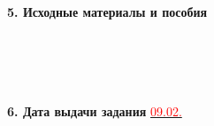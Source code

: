 \documentclass[fontsize=12pt]{diploma}
\begin{document}
\textbf{5. Исходные материалы и пособия}\\ %
\\
\\
\\
\\

\textbf{6. Дата выдачи задания} \uline{\textcolor{red}{09.02.\the\year} \hfill}

\makeTaskSignatures
\end{document}
